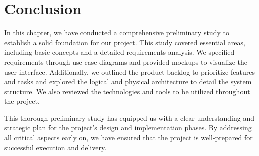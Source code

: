 \section*{Conclusion}
In this chapter, we have conducted a comprehensive preliminary study to establish a solid foundation for our project. This study covered essential areas, including basic concepts and a detailed requirements analysis. We specified requirements through use case diagrams and provided mockups to visualize the user interface. Additionally, we outlined the product backlog to prioritize features and tasks and explored the logical and physical architecture to detail the system structure. We also reviewed the technologies and tools to be utilized throughout the project.

This thorough preliminary study has equipped us with a clear understanding and strategic plan for the project's design and implementation phases. By addressing all critical aspects early on, we have ensured that the project is well-prepared for successful execution and delivery.